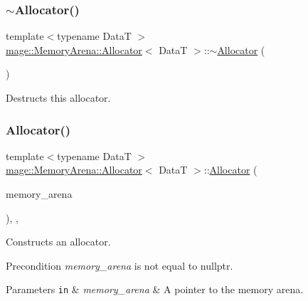 \subsubsection{\texorpdfstring{$\sim$\+Allocator()}{~Allocator()}}
{\footnotesize\ttfamily template$<$typename DataT $>$ \\
\hyperlink{classmage_1_1_memory_arena_1_1_allocator}{mage\+::\+Memory\+Arena\+::\+Allocator}$<$ DataT $>$\+::$\sim$\hyperlink{classmage_1_1_memory_arena_1_1_allocator}{Allocator} (\begin{DoxyParamCaption}{ }\end{DoxyParamCaption})\hspace{0.3cm}{\ttfamily [default]}}

Destructs this allocator. \hypertarget{classmage_1_1_memory_arena_1_1_allocator_a10a6ea82aab121d4e04efa004a49910b}{}\label{classmage_1_1_memory_arena_1_1_allocator_a10a6ea82aab121d4e04efa004a49910b} 
\subsubsection{\texorpdfstring{Allocator()}{Allocator()}\hspace{0.1cm}{\footnotesize\ttfamily [4/4]}}
{\footnotesize\ttfamily template$<$typename DataT $>$ \\
\hyperlink{classmage_1_1_memory_arena_1_1_allocator}{mage\+::\+Memory\+Arena\+::\+Allocator}$<$ DataT $>$\+::\hyperlink{classmage_1_1_memory_arena_1_1_allocator}{Allocator} (\begin{DoxyParamCaption}\item[{\hyperlink{classmage_1_1_memory_arena}{Memory\+Arena} $\ast$}]{memory\+\_\+arena }\end{DoxyParamCaption})\hspace{0.3cm}{\ttfamily [explicit]}, {\ttfamily [private]}, {\ttfamily [noexcept]}}

Constructs an allocator.

\begin{DoxyPrecond}{Precondition}
{\itshape memory\+\_\+arena} is not equal to {\ttfamily nullptr}. 
\end{DoxyPrecond}

\begin{DoxyParams}[1]{Parameters}
\mbox{\tt in}  & {\em memory\+\_\+arena} & A pointer to the memory arena. \\
\hline
\end{DoxyParams}


